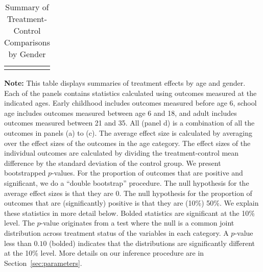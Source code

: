 \begin{table}[!htpb]
\begin{threeparttable}
\caption{Summary of Treatment-Control Comparisons by Gender} \label{table:summary}
\centering 
\begin{tabularx}{16.5cm}{XcX}
&  & 
\end{tabularx}
\begin{tablenotes}
\footnotesize
\item \textbf{Note:} This table displays summaries of treatment effects by age and gender. Each of the panels contains statistics calculated using outcomes measured at the indicated ages. Early childhood includes outcomes measured before age 6, school age includes outcomes measured between age 6 and 18, and adult includes outcomes measured between 21 and 35. All (panel d) is a combination of all the outcomes in panels (a) to (c). The average effect size is calculated by averaging over the effect sizes of the outcomes in the age category. The effect sizes of the individual outcomes are calculated by dividing the treatment-control mean difference by the standard deviation of the control group. We present bootstrapped $p$-values. For the proportion of outcomes that are positive and significant, we do a ``double bootstrap'' procedure. The null hypothesis for the average effect sizes is that they are 0. The null hypothesis for the proportion of outcomes that are (significantly) positive is that they are (10\%) 50\%. We explain these statistics in more detail below. Bolded statistics are significant at the 10\% level. The \citet{Rosenbaum_2005_Distribution_JRSS} $p$-value originates from a test where the null is a common joint distribution  across treatment status of the variables in each category. A $p$-value less than $0.10$ (bolded) indicates that the distributions are significantly different at the 10\% level. More details on our inference procedure are in Section~\ref{sec:parameters}.
\end{tablenotes}
\end{threeparttable}
\end{table}

